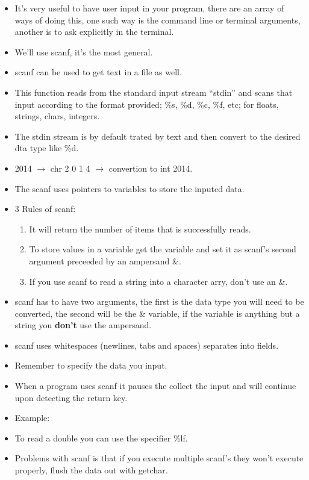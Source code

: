 \begin{itemize}
    \item It's very useful to have user input in your program, there are an array of ways of doing this, one such way is the command line or terminal arguments, another is to ask explicitly in the terminal.
    \item We'll use scanf, it's the most general.
    \item scanf can be used to get text in a file as well.
    \item This function reads from the standard input stream ``stdin'' and scans that input according to the format provided; \%s, \%d, \%c, \%f, etc; for floats, strings, chars, integers.
    \item The stdin stream is by default trated by text and then convert to the desired dta type like \%d.
    \item 2014 $\rightarrow$ chr 2 0 1 4 $\rightarrow$ convertion to int 2014.
    \item The scanf uses pointers to variables to store the inputed data.
    \item 3 Rules of scanf: 
        \begin{enumerate}
            \item It will return the number of items that is successfully reads.
            \item To store values in a variable get the variable and set it as scanf's second argument preceeded by an ampersand \&.
            \item If you use scanf to read a string into a character arry, don't use an \&.
        \end{enumerate}
    \item scanf has to have two arguments, the first is the data type you will need to be converted, the second will be the \& variable, if the variable is anything but a string you \textbf{don't} use the ampersand.
    \item scanf uses whitespaces (newlines, tabs and spaces) separates into fields.
    \item Remember to specify the data you input.
    \item When a program uses scanf it pauses the collect the input and will continue upon detecting the return key.
    \item Example:
    
    \item To read a double you can use the specifier \%lf.
    \item Problems with scanf is that if you execute multiple scanf's they won't execute properly, flush the data out with getchar.
\end{itemize}
